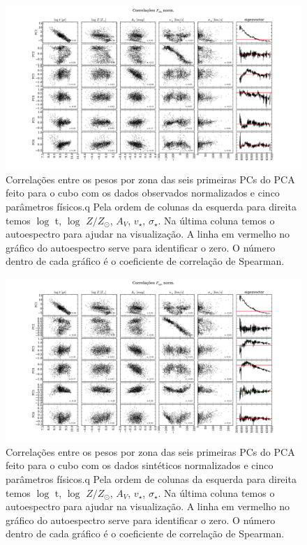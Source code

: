 \begin{figure}
    \includegraphics[width=1.3\textwidth, angle=-90]{figuras/K0277-correl-f_obs_norm-PCvsPhys.pdf}
	\caption[Correlações PCs vs. par\^ametros f\'isicos - $F_{obs}$ norm.]
    {Correlações entre os pesos por zona das seis primeiras PCs do PCA feito para o cubo com os dados observados
    normalizados e cinco parâmetros físicos.q Pela ordem de colunas da esquerda para direita temos $\log$ t, $\log$ $Z /
    Z_{\odot}$, $A_V$, $v_{\star}$, $\sigma_{\star}$. Na última coluna temos o autoespectro para ajudar na visualização.
    A linha em vermelho no gráfico do autoespectro serve para identificar o zero. O número dentro de cada gráfico é o
    coeficiente de correlação de Spearman.}
    \label{fig:cap4:K0277correfobsnorm}
\end{figure}

\begin{figure}
    \includegraphics[width=1.3\textwidth, angle=-90]{figuras/K0277-correl-f_syn_norm-PCvsPhys.pdf}
	\caption[Correlações PCs vs. par\^ametros f\'isicos - $F_{syn}$ norm.]
    {Correlações entre os pesos por zona das seis primeiras PCs do PCA feito para o cubo com os dados sintéticos
    normalizados e cinco parâmetros físicos.q Pela ordem de colunas da esquerda para direita temos $\log$ t, $\log$ $Z /
    Z_{\odot}$, $A_V$, $v_{\star}$, $\sigma_{\star}$. Na última coluna temos o autoespectro para ajudar na visualização.
    A linha em vermelho no gráfico do autoespectro serve para identificar o zero. O número dentro de cada gráfico é o
    coeficiente de correlação de Spearman.}
    \label{fig:cap4:K0277correfsynorm}
\end{figure}

